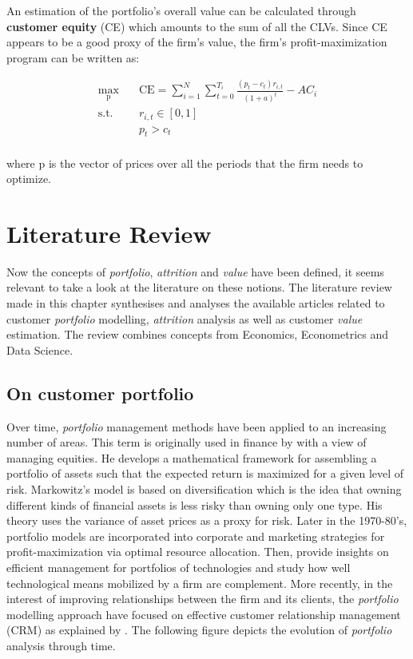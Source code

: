 \documentclass[
]{book}
\begin{document}
An estimation of the portfolio's overall value can be calculated through \textbf{customer equity} (CE) which amounts to the sum of all the CLVs. Since CE appears to be a good proxy of the firm's value, the firm's profit-maximization program can be written as:

\begin{equation}
\begin{aligned}
\max_{\mathrm{p}} \quad & \textrm{CE} = \sum_{i=1}^{N} \sum_{t=0}^{T_i} \frac{(p_t - c_t)r_{i,t}}{(1+a)^t} - AC_i\\
\textrm{s.t.} \quad & r_{i,t} \in [0, 1]\\
  &p_t > c_t    \\
\end{aligned}
\label{eq:maxprofit}
\end{equation}

where \(\mathrm{p}\) is the vector of prices over all the periods that the firm needs to optimize.

\hypertarget{literature}{%
\chapter{Literature Review}\label{literature}}

Now the concepts of \emph{portfolio}, \emph{attrition} and \emph{value} have been defined, it seems relevant to take a look at the literature on these notions. The literature review made in this chapter synthesises and analyses the available articles related to customer \emph{portfolio} modelling, \emph{attrition} analysis as well as customer \emph{value} estimation. The review combines concepts from Economics, Econometrics and Data Science.

\hypertarget{portfolio}{%
\section{On customer portfolio}\label{portfolio}}

Over time, \emph{portfolio} management methods have been applied to an increasing number of areas. This term is originally used in finance by \citet{MARKOWITZ} with a view of managing equities. He develops a mathematical framework for assembling a portfolio of assets such that the expected return is maximized for a given level of risk. Markowitz's model is based on diversification which is the idea that owning different kinds of financial assets is less risky than owning only one type. His theory uses the variance of asset prices as a proxy for risk. Later in the 1970-80's, portfolio models are incorporated into corporate \citep{WIND} and marketing \citep{DAY} strategies for profit-maximization via optimal resource allocation. Then, \citet{CAPON} provide insights on efficient management for portfolios of technologies and study how well technological means mobilized by a firm are complement. More recently, in the interest of improving relationships between the firm and its clients, the \emph{portfolio} modelling approach have focused on effective customer relationship management (CRM) as explained by \citet{CPM_CRM}. The following figure depicts the evolution of \emph{portfolio} analysis through time.
\end{document}
